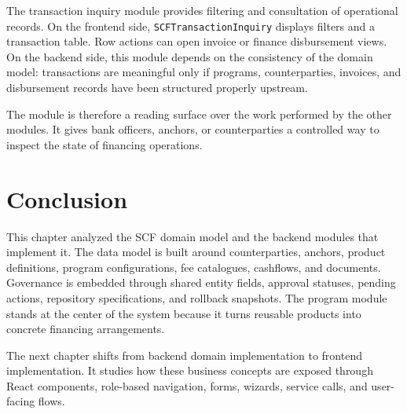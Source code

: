 The transaction inquiry module provides filtering and consultation of operational records. On the frontend side, \texttt{SCFTransactionInquiry} displays filters and a transaction table. Row actions can open invoice or finance disbursement views. On the backend side, this module depends on the consistency of the domain model: transactions are meaningful only if programs, counterparties, invoices, and disbursement records have been structured properly upstream.

The module is therefore a reading surface over the work performed by the other modules. It gives bank officers, anchors, or counterparties a controlled way to inspect the state of financing operations.

\section{Conclusion}
\label{sec:ch3_conclusion}

This chapter analyzed the SCF domain model and the backend modules that implement it. The data model is built around counterparties, anchors, product definitions, program configurations, fee catalogues, cashflows, and documents. Governance is embedded through shared entity fields, approval statuses, pending actions, repository specifications, and rollback snapshots. The program module stands at the center of the system because it turns reusable products into concrete financing arrangements.

The next chapter shifts from backend domain implementation to frontend implementation. It studies how these business concepts are exposed through React components, role-based navigation, forms, wizards, service calls, and user-facing flows.
